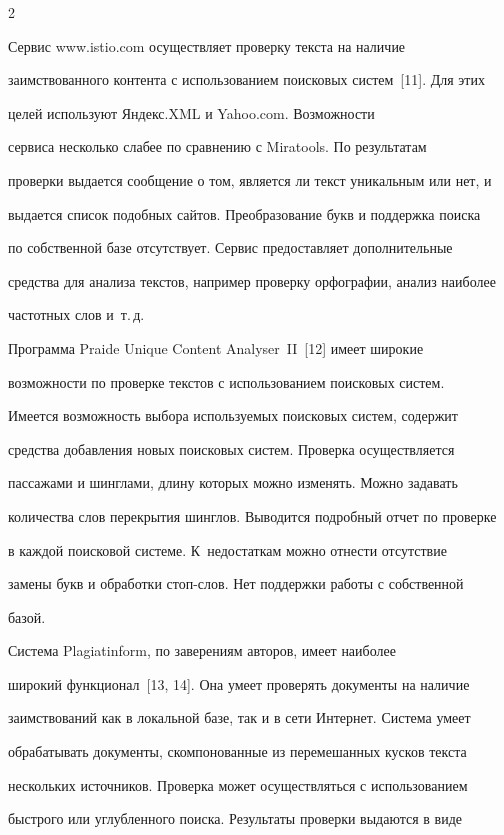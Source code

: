 \begin{multicols}{2}
  

  Сервис {\sf www.istio.com} осуществляет проверку текста на наличие 

заимствованного контента с использованием поисковых сис\-тем~[11]. Для этих 

целей используют Яндекс.XML и Yahoo.com. Возможности 

сервиса несколько слабее по сравнению с Miratools. По результатам 

проверки выдается сообщение о том, является ли текст уникальным или нет, и 

выдается список подобных сайтов. Преобразование букв и поддержка поиска 

по собственной базе отсутствует. Сервис предоставляет дополнительные 

средства для анализа текстов, например проверку орфографии, анализ наиболее 

частотных слов и~т.\,д.

  

  Программа Praide Unique Content Analyser~II~[12] имеет широкие 

возможности по проверке текстов с использованием поисковых сис\-тем. 

Имеется возможность выбора используемых поисковых сис\-тем, содержит 

средства добавления новых поисковых сис\-тем. Проверка осуществляется 

пассажами и шинглами, длину которых можно изменять. Можно задавать 

количества слов перекрытия шинглов. Выводится подробный отчет по проверке 

в каждой поисковой сис\-те\-ме. К~недостаткам можно отнести отсутствие 

замены букв и обработки стоп-слов. Нет поддержки работы с собственной 

базой.

  

  Система {Plagiatinform}, по заверениям авторов, имеет наиболее 

широкий функционал~[13, 14]. Она умеет проверять документы на наличие 

заимствований как в локальной базе, так и в сети Интернет. Сис\-те\-ма умеет 

обрабатывать документы, скомпонованные из перемешанных кусков текста 

нескольких источников. Проверка может осуществляться с использованием 

быстрого или углубленного поиска. Результаты проверки выдаются в виде 


\end{multicols}
